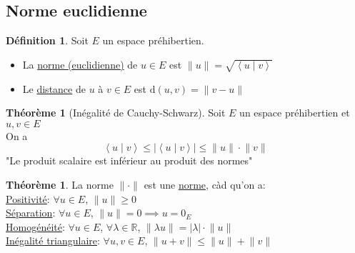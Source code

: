 \documentclass[10pt,a4paper]{article}
\theoremstyle{definition}
\newtheorem{theorem}[proposition]{Théorème}
\newtheorem{definition}[proposition]{Définition}
\newcommand{\vp}[2]{\left< #1 \mid #2 \right>}
\begin{document}
\subsection{Norme euclidienne}
\begin{definition}
Soit $E$ un espace préhibertien.
\begin{itemize}
\item La \uline{norme (euclidienne)} de $u \in E$ est $\lVert u \rVert = \sqrt{\vp{u}{v}}$
\item Le \uline{distance} de $u$ à $v \in E$ est $\text{d}(u, v) = \lVert v - u \rVert$
\end{itemize}
\end{definition}
\begin{theorem}[Inégalité de Cauchy-Schwarz]
Soit $E$ un espace préhibertien et $u, v \in E$ \\
On a
\[\vp{u}{v} \leq \left| \vp{u}{v} \right| \leq \lVert u \rVert \cdot \lVert v \rVert\]
"Le produit scalaire est inférieur au produit des normes"
\end{theorem}
\begin{theorem}
La norme $\lVert \cdot \rVert$ est une \uline{norme}, càd qu'on a: \\
\uline{Positivité}: $\forall u \in E$, $\lVert u \rVert \geq 0$ \\
\uline{Séparation}: $\forall u \in E$, $\lVert u \rVert = 0 \implies u = 0_E$ \\
\uline{Homogénéité}: $\forall u \in E$, $\forall \lambda \in \mathbb{R}$, $\lVert \lambda u \rVert = |\lambda| \cdot \lVert u \rVert$ \\
\uline{Inégalité triangulaire}: $\forall u, v \in E$, $\lVert u + v \rVert \leq \lVert u \rVert + \lVert v \rVert$ \\
\end{theorem}
\end{document}
